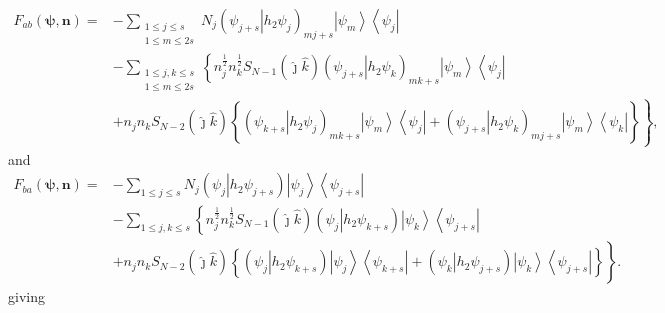 \documentclass[aps,preprint]{revtex4}%
\begin{document}
\begin{align}
F_{ab}\left(  \mathbf{\psi,n}\right)  =  &  -\sum_{\substack{1\leq j\leq
s\\1\leq m\leq2s}}N_{j}\left(  \left.  \psi_{j+s}\right\vert h_{2}\psi
_{j}\right)  _{mj+s}\left\vert \psi_{m}\right\rangle \left\langle \psi
_{j}\right\vert \nonumber\\
&  -\sum_{\substack{1\leq j,k\leq s\\1\leq m\leq2s}}\left\{  n_{j}^{\frac
{1}{2}}n_{k}^{\frac{1}{2}}S_{N-1}\left(  \hat{\jmath}\hat{k}\right)  \right.
\left(  \left.  \psi_{j+s}\right\vert h_{2}\psi_{k}\right)  _{mk+s}\left\vert
\psi_{m}\right\rangle \left\langle \psi_{j}\right\vert \nonumber\\
&  +n_{j}n_{k}S_{N-2}\left(  \hat{\jmath}\hat{k}\right)  \left.  \overset
{}{\left\{  \left(  \left.  \psi_{k+s}\right\vert h_{2}\psi_{j}\right)
_{mk+s}\left\vert \psi_{m}\right\rangle \left\langle \psi_{j}\right\vert
+\left(  \left.  \psi_{j+s}\right\vert h_{2}\psi_{k}\right)  _{mj+s}\left\vert
\psi_{m}\right\rangle \left\langle \psi_{k}\right\vert \right\}  }\right\}  ,
\end{align}
and%
\begin{align}
F_{ba}\left(  \mathbf{\psi,n}\right)  =  &  -\sum_{1\leq j\leq s}N_{j}\left(
\left.  \psi_{j}\right\vert h_{2}\psi_{j+s}\right)  \left\vert \psi
_{j}\right\rangle \left\langle \psi_{j+s}\right\vert \nonumber\\
&  -\sum_{1\leq j,k\leq s}\left\{  n_{j}^{\frac{1}{2}}n_{k}^{\frac{1}{2}%
}S_{N-1}\left(  \hat{\jmath}\hat{k}\right)  \right.  \left(  \left.  \psi
_{j}\right\vert h_{2}\psi_{k+s}\right)  \left\vert \psi_{k}\right\rangle
\left\langle \psi_{j+s}\right\vert \nonumber\\
&  +n_{j}n_{k}S_{N-2}\left(  \hat{\jmath}\hat{k}\right)  \left.  \overset
{}{\left\{  \left(  \left.  \psi_{j}\right\vert h_{2}\psi_{k+s}\right)
\left\vert \psi_{j}\right\rangle \left\langle \psi_{k+s}\right\vert +\left(
\left.  \psi_{k}\right\vert h_{2}\psi_{j+s}\right)  \left\vert \psi
_{k}\right\rangle \left\langle \psi_{j+s}\right\vert \right\}  }\right\}  .
\end{align}
giving
\end{document}
